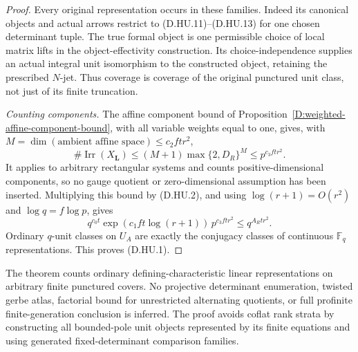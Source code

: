 \begin{proof}
Every original representation occurs in these families.
Indeed its canonical objects and actual arrows restrict
to (D.HU.11)--(D.HU.13) for one chosen determinant tuple.
The true formal object is one permissible choice of local
matrix lifts in the object-effectivity construction.
Its choice-independence supplies an actual integral unit
isomorphism to the constructed object, retaining the
prescribed $N$-jet. Thus coverage is coverage of the
original punctured unit class, not just of its finite
truncation.

\emph{Counting components.}
The affine component bound of
Proposition~\ref{D:weighted-affine-component-bound}, with
all variable weights equal to one, gives, with
$M=\dim(\text{ambient affine space})\le c_2ftr^2$,
\[
 \#\operatorname{Irr}(X_{\boldsymbol L})
            \le(M+1)\max\{2,D_R\}^{M}
            \le p^{c_3ftr^2}.                          \tag{D.HU.17}
\]
It applies to arbitrary rectangular systems and counts
positive-dimensional components, so no gauge quotient or
zero-dimensional assumption has been inserted.
Multiplying this bound by (D.HU.2), and using
$\log(r+1)=O(r^2)$ and $\log q=f\log p$, gives
\[
 q^{c_0t}\exp(c_1ft\log(r+1))\,p^{c_3ftr^2}
                                      \le q^{A_Rtr^2}.
\]
Ordinary $q$-unit classes on $U_A$ are exactly the
conjugacy classes of continuous $\mathbb F_q$
representations. This proves (D.HU.1).
\end{proof}

\begin{remark}
The theorem counts ordinary defining-characteristic
linear representations on arbitrary finite punctured
covers. No projective determinant enumeration, twisted
gerbe atlas, factorial bound for unrestricted alternating
quotients, or full profinite finite-generation conclusion
is inferred. The proof avoids coflat rank strata by
constructing all bounded-pole unit objects represented
by its finite equations and using generated
fixed-determinant comparison families.
\end{remark}
